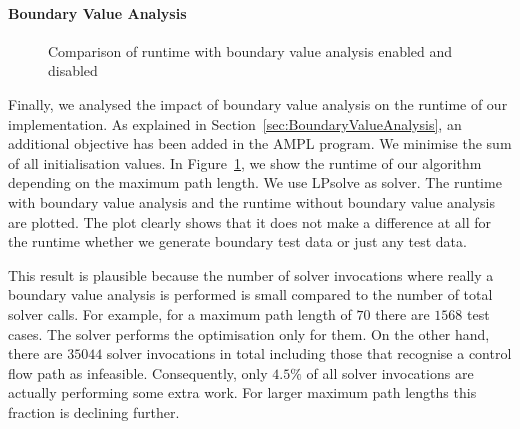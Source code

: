 \documentclass[runningheads,a4paper]{llncs}%
\begin{document}
\paragraph{Boundary Value Analysis}
\label{sec:caseStudyBoundaryValues}
\begin{figure}
\begin{center}
%
\end{center}%
\caption{Comparison of runtime with boundary value analysis enabled and disabled}%
\label{fig:RuntimeBoundaryValue}%
\end{figure}%
Finally, we analysed the impact of boundary value analysis on the runtime of our
implementation. As explained in Section~\ref{sec:BoundaryValueAnalysis}, an
additional objective has been added in the AMPL program. We minimise the sum of
all initialisation values. In Figure~\ref{fig:RuntimeBoundaryValue}, we show the
runtime of our algorithm depending on the maximum path length. We use LPsolve as
solver. The runtime with boundary value analysis and the runtime without
boundary value analysis are plotted. The plot clearly shows that it does not
make a difference at all for the runtime whether we generate boundary test data
or just any test data.

This result is plausible because the number of solver invocations where really a
boundary value analysis is performed is small compared to the number of total
solver calls. For example, for a maximum path length of $70$ there are $1568$
test cases. The solver performs the optimisation only for them. On the other
hand, there are $35044$ solver invocations in total including those that
recognise a control flow path as infeasible. Consequently, only $4.5\%$ of all
solver invocations are actually performing some extra work. For larger maximum
path lengths this fraction is declining further.
\end{document}
